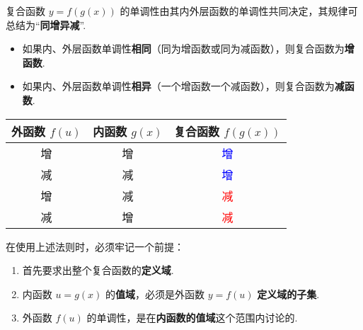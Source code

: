 \begin{theorem}[复合函数单调性法则]
	复合函数 $y=f(g(x))$ 的单调性由其内外层函数的单调性共同决定，其规律可总结为“\textbf{同增异减}”.
	\begin{itemize}
		\item 如果内、外层函数单调性\textbf{相同}（同为增函数或同为减函数），则复合函数为\textbf{增函数}.
		\item 如果内、外层函数单调性\textbf{相异}（一个增函数一个减函数），则复合函数为\textbf{减函数}.
	\end{itemize}
	\begin{center}
		\begin{tabular}{ccc}
			\toprule
			\textbf{外函数 $f(u)$} & \textbf{内函数 $g(x)$} & \textbf{复合函数 $f(g(x))$} \\
			\midrule
			增 & 增 & \textcolor{blue}{增} \\
			减 & 减 & \textcolor{blue}{增} \\
			\midrule
			增 & 减 & \textcolor{red}{减} \\
			减 & 增 & \textcolor{red}{减} \\
			\bottomrule
		\end{tabular}
	\end{center}
\end{theorem}

\begin{note}
	在使用上述法则时，必须牢记一个前提：
	\begin{enumerate}
		\item 首先要求出整个复合函数的\textbf{定义域}.
		\item 内函数 $u=g(x)$ 的\textbf{值域}，必须是外函数 $y=f(u)$ \textbf{定义域的子集}.
		\item 外函数 $f(u)$ 的单调性，是在\textbf{内函数的值域}这个范围内讨论的.
	\end{enumerate}
\end{note}

